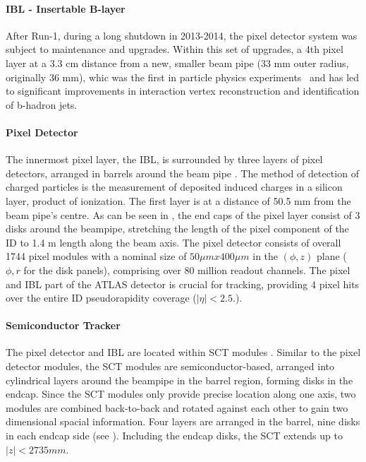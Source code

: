\paragraph{IBL - Insertable B-layer}
After Run-1, during a long shutdown in 2013-2014, the pixel detector system was subject to maintenance and upgrades. Within this set of upgrades, a 4th pixel layer at a 3.3 cm distance from a new, smaller beam pipe (33 mm outer radius, originally 36 mm), whic was the first in particle physics experiments~\cite{IBLTDR, IBLproceedings} and has led to significant improvements in interaction vertex reconstruction and identification of b-hadron jets.


\paragraph{Pixel Detector}
The innermost pixel layer, the IBL, is surrounded by three layers of pixel detectors, arranged in barrels around the beam pipe \cite{PixelDesignPerformance,PixelPerformanceProceedings}. The method of detection of charged particles is the measurement of deposited induced charges in a silicon layer, product of ionization. The first layer is at a distance of 50.5 mm from the beam pipe's centre. As can be seen in \Fig{\ref{fig:atlas:atlas:atlas_inner_detector:general}}, the end caps of the pixel layer consist of 3 disks around the beampipe, stretching the length of the pixel component of the \ac{ID} to 1.4 m length along the beam axis.  The pixel detector consists of overall 1744 pixel modules with a nominal size of $50 \mu m x 400 \mu m$ in the $(\phi, z)$ plane ($\phi, r$ for the disk panels), comprising over 80 million readout channels.  
The pixel and \ac{IBL} part of the \ac{ATLAS} detector is crucial for tracking, providing 4 pixel hits over the entire \ac{ID} pseudorapidity coverage ($|\eta| < 2.5.$).  

\paragraph{Semiconductor Tracker}
The pixel detector and \ac{IBL} are located within \ac{SCT} modules \cite{SCT}.  
Similar to the pixel detector modules, the \ac{SCT} modules are semiconductor-based, arranged into cylindrical layers around the beampipe in the barrel region, forming disks in the endcap. Since the \ac{SCT} modules only provide precise location along one axis, two modules are combined back-to-back and rotated against each other to gain two dimensional spacial information. Four layers are arranged in the barrel, nine disks in each endcap side (see \Fig{\ref{fig:atlas:atlas:atlas_inner_detector:general}}). Including the endcap disks, the \ac{SCT} extends up to $|z| < 2735 mm$.

